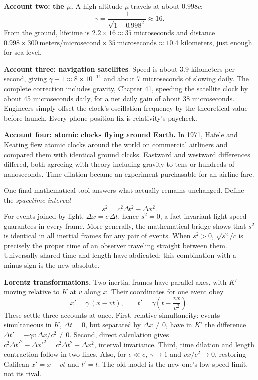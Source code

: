 \begin{mainline}
\textbf{Account two: the \(\mu\).} A high-altitude \(\mu\) travels at about \(0.998c\):
\[
\gamma=\frac{1}{\sqrt{1-0.998^{2}}}\approx 16.
\]
From the ground, lifetime is \(2.2\times16\approx 35\) microseconds and distance \(0.998\times300\ \text{meters/microsecond}\times35\ \text{microseconds}\approx 10.4\) kilometers, just enough for sea level.

\textbf{Account three: navigation satellites.} Speed is about 3.9 kilometers per second, giving \(\gamma-1\approx 8\times10^{-11}\) and about 7 microseconds of slowing daily. The complete correction includes gravity, Chapter 41, speeding the satellite clock by about 45 microseconds daily, for a net daily gain of about 38 microseconds. Engineers simply offset the clock's oscillation frequency by the theoretical value before launch. Every phone position fix is relativity's paycheck.

\textbf{Account four: atomic clocks flying around Earth.} In 1971, Hafele and Keating flew atomic clocks around the world on commercial airliners and compared them with identical ground clocks. Eastward and westward differences differed, both agreeing with theory including gravity to tens or hundreds of nanoseconds. Time dilation became an experiment purchasable for an airline fare.
\end{mainline}

\begin{mainline}
One final mathematical tool answers what actually remains unchanged. Define the \emph{spacetime interval}
\[
s^{2}=c^{2}\Delta t^{2}-\Delta x^{2}.
\]
For events joined by light, \(\Delta x=c\,\Delta t\), hence \(s^{2}=0\), a fact invariant light speed guarantees in every frame. More generally, the mathematical bridge shows that \(s^{2}\) is identical in all inertial frames for any pair of events. When \(s^{2}>0\), \(\sqrt{s^{2}}/c\) is precisely the proper time of an observer traveling straight between them. Universally shared time and length have abdicated; this combination with a minus sign is the new absolute.
\end{mainline}

\begin{mathbridge}
\textbf{Lorentz transformations.} Two inertial frames have parallel axes, with \(K'\) moving relative to \(K\) at \(v\) along \(x\). Their coordinates for one event obey
\[
x'=\gamma\,(x-vt),\qquad
t'=\gamma\left(t-\frac{vx}{c^{2}}\right).
\]
These settle three accounts at once. First, relative simultaneity: events simultaneous in \(K\), \(\Delta t=0\), but separated by \(\Delta x\neq 0\), have in \(K'\) the difference \(\Delta t'=-\gamma v\,\Delta x/c^{2}\neq 0\). Second, direct calculation gives \(c^{2}\Delta t'^{2}-\Delta x'^{2}=c^{2}\Delta t^{2}-\Delta x^{2}\), interval invariance. Third, time dilation and length contraction follow in two lines. Also, for \(v\ll c\), \(\gamma\to 1\) and \(vx/c^{2}\to 0\), restoring Galilean \(x'=x-vt\) and \(t'=t\). The old model is the new one's low-speed limit, not its rival.
\end{mathbridge}

